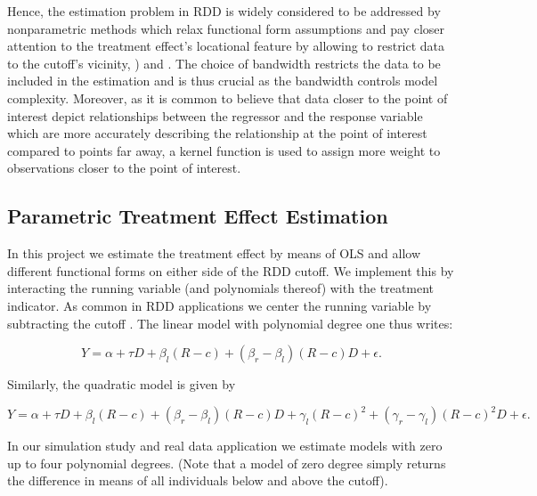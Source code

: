 Hence, the estimation problem in RDD is widely considered to be addressed by nonparametric methods which relax functional form assumptions and pay closer attention to the treatment effect's locational feature by allowing to restrict data to the cutoff's vicinity, \cite{hahn_et_al}) and \cite{lee_lemieux_2010}. The choice of bandwidth restricts the data to be included in the estimation and is thus crucial as the bandwidth controls model complexity. Moreover, as it is common to believe that data closer to the point of interest depict relationships between the regressor and the response variable which are more accurately describing the relationship at the point of interest compared to points far away, a kernel function is used to assign more weight to observations closer to the point of interest.


\subsection{Parametric Treatment Effect Estimation} %
\label{sec: param}
In this project we estimate the treatment effect by means of OLS and allow different functional forms on either side of the RDD cutoff. We implement this by interacting the running variable (and polynomials thereof) with the treatment indicator. As common in RDD applications we center the running variable by subtracting the cutoff \cite{lee_lemieux_2010}. The linear model with polynomial degree one thus writes:

\begin{equation}
Y = \alpha + \tau D + \beta_{l} (R-c) + (\beta_{r} - \beta_{l}) (R-c) D + \epsilon .
\label{eq: model_general}
\end{equation}

Similarly, the quadratic model is given by

\begin{equation}
Y = \alpha + \tau D + \beta_{l} (R-c) + (\beta_{r} - \beta_{l}) (R-c) D + \gamma_{l} (R-c)^2 + (\gamma_{r} - \gamma_{l}) (R-c)^2 D + \epsilon .
\end{equation}

In our simulation study and real data application we estimate models with zero up to four polynomial degrees. (Note that a model of zero degree simply returns the difference in means of all individuals below and above the cutoff).




